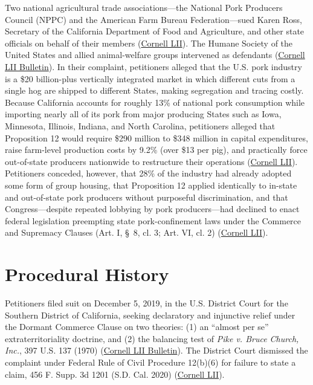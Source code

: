 \documentclass[12pt]{article}
\begin{document}
Two national agricultural trade associations---the National Pork Producers Council (NPPC) and the American Farm Bureau Federation---sued Karen Ross, Secretary of the California Department of Food and Agriculture, and other state officials on behalf of their members (\href{https://www.law.cornell.edu/supremecourt/text/21-468}{Cornell LII}). The Humane Society of the United States and allied animal-welfare groups intervened as defendants (\href{https://www.law.cornell.edu/supct/cert/21-468}{Cornell LII Bulletin}). In their complaint, petitioners alleged that the U.S. pork industry is a \$20 billion-plus vertically integrated market in which different cuts from a single hog are shipped to different States, making segregation and tracing costly. Because California accounts for roughly 13\% of national pork consumption while importing nearly all of its pork from major producing States such as Iowa, Minnesota, Illinois, Indiana, and North Carolina, petitioners alleged that Proposition 12 would require \$290 million to \$348 million in capital expenditures, raise farm-level production costs by 9.2\% (over \$13 per pig), and practically force out-of-state producers nationwide to restructure their operations (\href{https://www.law.cornell.edu/supremecourt/text/21-468}{Cornell LII}). Petitioners conceded, however, that 28\% of the industry had already adopted some form of group housing, that Proposition 12 applied identically to in-state and out-of-state pork producers without purposeful discrimination, and that Congress---despite repeated lobbying by pork producers---had declined to enact federal legislation preempting state pork-confinement laws under the Commerce and Supremacy Clauses (Art. I, \S~8, cl. 3; Art. VI, cl. 2) (\href{https://www.law.cornell.edu/supremecourt/text/21-468}{Cornell LII}).

\section{Procedural History}
Petitioners filed suit on December 5, 2019, in the U.S. District Court for the Southern District of California, seeking declaratory and injunctive relief under the Dormant Commerce Clause on two theories: (1) an ``almost per se'' extraterritoriality doctrine, and (2) the balancing test of \textit{Pike v. Bruce Church, Inc.}, 397 U.S. 137 (1970) (\href{https://www.law.cornell.edu/supct/cert/21-468}{Cornell LII Bulletin}). The District Court dismissed the complaint under Federal Rule of Civil Procedure 12(b)(6) for failure to state a claim, 456 F. Supp. 3d 1201 (S.D. Cal. 2020) (\href{https://www.law.cornell.edu/supremecourt/text/21-468}{Cornell LII}).
\end{document}
